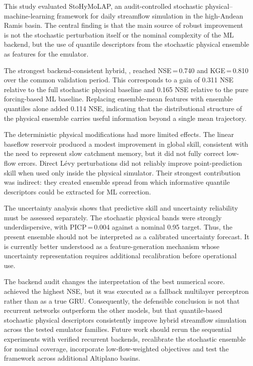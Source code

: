 \documentclass[a4paper,fleqn]{cas-sc}
\newcommand{\modelid}[1]{\begingroup\urlstyle{same}\path{#1}\endgroup}
\begin{document}
This study evaluated StoHyMoLAP, an audit-controlled stochastic
physical--machine-learning framework for daily streamflow simulation in
the high-Andean Ramis basin. The central finding is that the main source
of robust improvement is not the stochastic perturbation itself or the
nominal complexity of the ML backend, but the use of quantile
descriptors from the stochastic physical ensemble as features for the
emulator.

The strongest backend-consistent hybrid, \modelid{E6_HYB_XGB_QUANTILES},
reached NSE\,=\,0.740 and KGE\,=\,0.810 over the common validation
period. This corresponds to a gain of 0.311 NSE relative to the full
stochastic physical baseline and 0.165 NSE relative to the pure
forcing-based ML baseline. Replacing ensemble-mean features with
ensemble quantiles alone added 0.114 NSE, indicating that the
distributional structure of the physical ensemble carries useful
information beyond a single mean trajectory.

The deterministic physical modifications had more limited effects. The
linear baseflow reservoir produced a modest improvement in global skill,
consistent with the need to represent slow catchment memory, but it did
not fully correct low-flow errors. Direct L\'{e}vy perturbations did not
reliably improve point-prediction skill when used only inside the
physical simulator. Their strongest contribution was indirect: they
created ensemble spread from which informative quantile descriptors
could be extracted for ML correction.

The uncertainty analysis shows that predictive skill and uncertainty
reliability must be assessed separately. The stochastic physical bands
were strongly underdispersive, with PICP\,=\,0.004 against a nominal
0.95 target. Thus, the present ensemble should not be interpreted as a
calibrated uncertainty forecast. It is currently better understood as a
feature-generation mechanism whose uncertainty representation requires
additional recalibration before operational use.

The backend audit changes the interpretation of the best numerical
score. \modelid{E8_HYB_GRU_QUANTILES} achieved the highest NSE, but it was
executed as a fallback multilayer perceptron rather than as a true GRU.
Consequently, the defensible conclusion is not that recurrent networks
outperform the other models, but that quantile-based stochastic
physical descriptors consistently improve hybrid streamflow simulation
across the tested emulator families. Future work should rerun the
sequential experiments with verified recurrent backends, recalibrate the
stochastic ensemble for nominal coverage, incorporate low-flow-weighted
objectives and test the framework across additional Altiplano basins.
\end{document}
